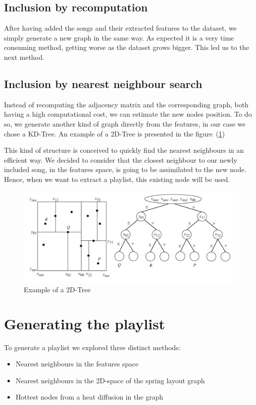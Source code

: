 \documentclass[11pt,a4paper,twoside]{article}
\begin{document}
\subsection{Inclusion by recomputation}
After having added the songs and their extracted features to the dataset, we simply generate a new graph in the same way. As expected it is a very time consuming method, getting worse as the dataset grows bigger. This led us to the next method. 

\subsection{Inclusion by nearest neighbour search}
Instead of recomputing the adjacency matrix and the corresponding graph, both having a high computational cost, we can estimate the new nodes position. To do so, we generate another kind of graph directly from the features, in our case we chose a KD-Tree.
An example of a 2D-Tree is presented in the figure~(\ref{fig:ex_tree})

This kind of structure is conceived to quickly find the nearest neighbours in an efficient way.
We decided to consider that the closest neighbour to our newly included song, in the features space, is going to be assimilated to the new node. Hence, when we want to extract a playlist, this existing node will be used. 

\begin{figure}[H]
  \centering
    \includegraphics[width=.7\textwidth]{./Figures/tree}
  \caption{Example of a 2D-Tree\cite{tree}}
  \label{fig:ex_tree}
\end{figure}

\section{Generating the playlist}

To generate a playlist we explored three distinct methods:
\begin{itemize}
\item Nearest neighbours in the features space
\item Nearest neighbours in the 2D-space of the spring layout graph 
\item Hottest nodes from a heat diffusion in the graph
\end{itemize}
\end{document}
